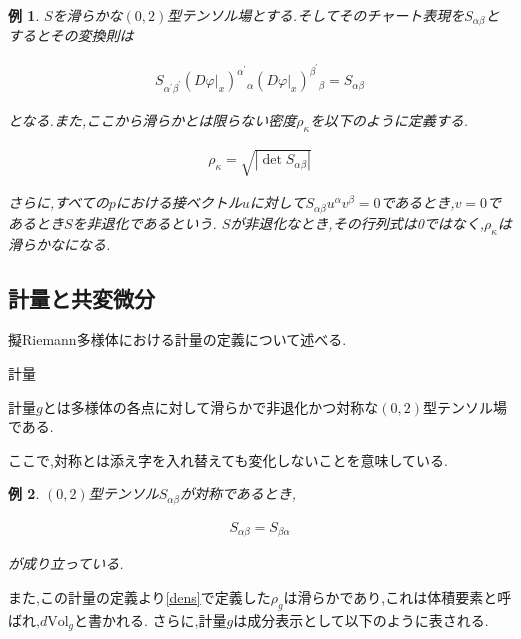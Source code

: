\documentclass{jsarticle}
\newtheorem{exm}{例}
\begin{document}
\begin{exm}
$S$を滑らかな$(0,2)$型テンソル場とする.そしてそのチャート表現を$S_{\alpha\beta}$とするとその変換則は

\begin{align}
S_{\alpha^\prime\beta^\prime}(D\varphi \rvert_x)^{\alpha^\prime}{}_\alpha (D\varphi \rvert_x)^{\beta^\prime}{}_\beta= S_{\alpha\beta}
\end{align}

となる.また,ここから滑らかとは限らない密度$\rho_\kappa$を以下のように定義する.

\begin{align}\label{dens}
\rho_\kappa=\sqrt{|\det S_{\alpha\beta}|}
\end{align}

さらに,すべての$p$における接ベクトル$u$に対して$S_{\alpha\beta}u^\alpha v^\beta=0$であるとき,$v=0$であるとき$S$を非退化であるという.
$S$が非退化なとき,その行列式は0ではなく,$\rho_\kappa$は滑らかなになる.

\end{exm}


\subsection{計量と共変微分}

擬Riemann多様体における計量の定義について述べる.

\begin{itembox}[l]{計量}

計量$g$とは多様体の各点に対して滑らかで非退化かつ対称な$(0,2)$型テンソル場である.

\end{itembox}

ここで,対称とは添え字を入れ替えても変化しないことを意味している.

\begin{exm}

$(0,2)$型テンソル$S_{\alpha\beta}$が対称であるとき,


\begin{align}
S_{\alpha\beta}=S_{\beta\alpha}
\end{align}

が成り立っている.

\end{exm}

また,この計量の定義より\eqref{dens}で定義した$\rho_g$は滑らかであり,これは体積要素と呼ばれ,$d\text{Vol}_g$と書かれる.
さらに,計量$g$は成分表示として以下のように表される.
\end{document}
